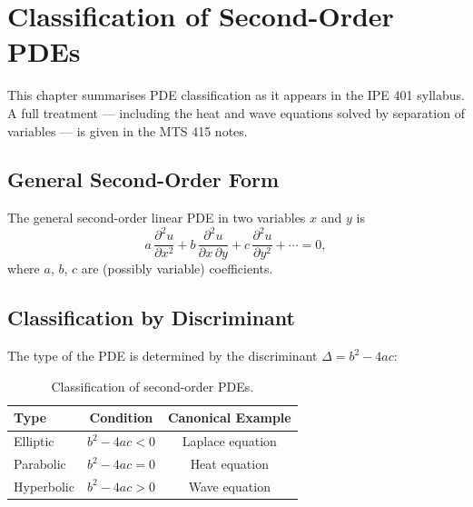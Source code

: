 \chapter{Classification of Second-Order PDEs}

\begin{remark}
This chapter summarises PDE classification as it appears in the IPE 401 syllabus.
A full treatment — including the heat and wave equations solved by separation of
variables — is given in the MTS 415 notes.
\end{remark}

\section{General Second-Order Form}

The general second-order linear PDE in two variables $x$ and $y$ is
\[
  a\,\frac{\partial^2 u}{\partial x^2}
  + b\,\frac{\partial^2 u}{\partial x\,\partial y}
  + c\,\frac{\partial^2 u}{\partial y^2}
  + \cdots = 0,
\]
where $a$, $b$, $c$ are (possibly variable) coefficients.

\section{Classification by Discriminant}

\begin{theorem}
The type of the PDE is determined by the discriminant $\Delta = b^2 - 4ac$:
\end{theorem}

\begin{table}[h!]
\centering
\renewcommand{\arraystretch}{1.5}
\begin{tabular}{lcc}
\toprule
\textbf{Type}   & \textbf{Condition}      & \textbf{Canonical Example} \\
\midrule
Elliptic        & $b^2 - 4ac < 0$         & Laplace equation           \\
Parabolic       & $b^2 - 4ac = 0$         & Heat equation              \\
Hyperbolic      & $b^2 - 4ac > 0$         & Wave equation              \\
\bottomrule
\end{tabular}
\caption{Classification of second-order PDEs.}
\end{table}

